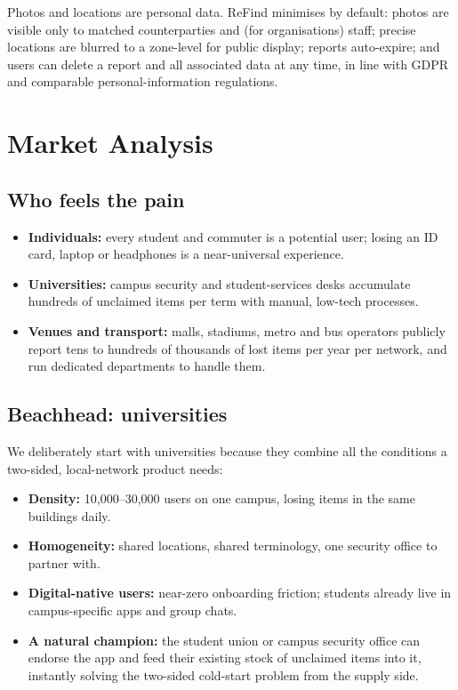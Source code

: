 \documentclass[11pt,a4paper]{article}
\begin{document}
Photos and locations are personal data. ReFind minimises by default: photos are visible only
to matched counterparties and (for organisations) staff; precise locations are blurred to a
zone-level for public display; reports auto-expire; and users can delete a report and all
associated data at any time, in line with GDPR and comparable personal-information
regulations.

\section{Market Analysis}

\subsection{Who feels the pain}

\begin{itemize}
  \item \textbf{Individuals:} every student and commuter is a potential user; losing an ID
        card, laptop or headphones is a near-universal experience.
  \item \textbf{Universities:} campus security and student-services desks accumulate
        hundreds of unclaimed items per term with manual, low-tech processes.
  \item \textbf{Venues and transport:} malls, stadiums, metro and bus operators publicly
        report tens to hundreds of thousands of lost items per year per network, and run
        dedicated departments to handle them.
\end{itemize}

\subsection{Beachhead: universities}

We deliberately start with universities because they combine all the conditions a two-sided,
local-network product needs:

\begin{itemize}
  \item \textbf{Density:} 10,000--30,000 users on one campus, losing items in the same
        buildings daily.
  \item \textbf{Homogeneity:} shared locations, shared terminology, one security office to
        partner with.
  \item \textbf{Digital-native users:} near-zero onboarding friction; students already live
        in campus-specific apps and group chats.
  \item \textbf{A natural champion:} the student union or campus security office can
        endorse the app and feed their existing stock of unclaimed items into it,
        instantly solving the two-sided cold-start problem from the supply side.
\end{itemize}
\end{document}
